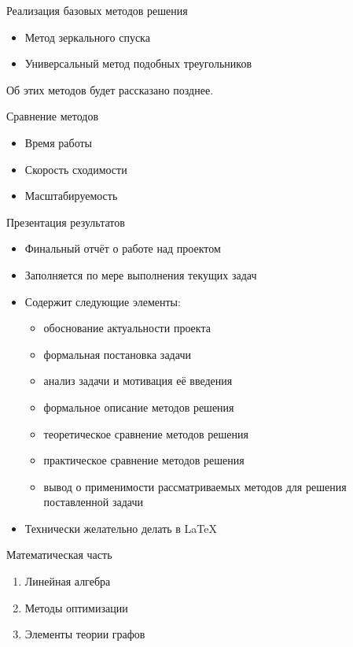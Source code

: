 \documentclass[12pt]{beamer}
\begin{document}
\begin{frame}{Реализация базовых методов решения}
\begin{itemize}
\item Метод зеркального спуска
\item Универсальный метод подобных треугольников
\end{itemize}

Об этих методов будет рассказано позднее.
\end{frame}

\begin{frame}{Сравнение методов}
\begin{itemize}
\item Время работы
\item Скорость сходимости
\item Масштабируемость
\end{itemize}
\end{frame}

\begin{frame}{Презентация результатов}
\begin{itemize}
\item Финальный отчёт о работе над проектом
\item Заполняется по мере выполнения текущих задач
\item Содержит следующие элементы:
\begin{itemize}
\item обоснование актуальности проекта
\item формальная постановка задачи
\item анализ задачи и мотивация её введения
\item формальное описание методов решения
\item теоретическое сравнение методов решения
\item практическое сравнение методов решения
\item вывод о применимости рассматриваемых методов для решения поставленной задачи
\end{itemize}
\item Технически желательно делать в \LaTeX
\end{itemize}
\end{frame}

\begin{frame}{Математическая часть}
\begin{enumerate}
\item Линейная алгебра
\item Методы оптимизации
\item Элементы теории графов
\end{enumerate}
\end{frame}
\end{document}
